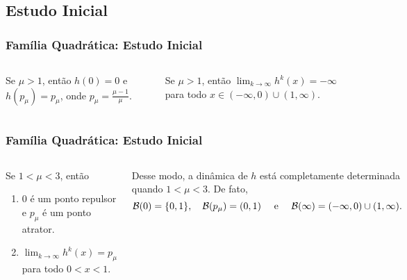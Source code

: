 \subsection{Estudo Inicial}

\begin{frame}
\vspace{5pt}
\frametitle{Família Quadrática: Estudo Inicial}
\begin{columns}
\column{\dimexpr\paperwidth-15pt}

\begin{proposition}
Se $\mu > 1$, então $h(0) = 0$ e $h(p_\mu) = p_\mu$, onde $p_\mu = \frac{\mu-1}{\mu}$.
\end{proposition}

\begin{proposition}
Se $\mu > 1$, então $\lim_{k \to \infty} h^k(x) = - \infty$ para todo $x \in (-\infty, 0) \cup (1, \infty)$.
\end{proposition}

\end{columns}
\end{frame}


\begin{frame}
\vspace{5pt}
\frametitle{Família Quadrática: Estudo Inicial}
\begin{columns}
\column{\dimexpr\paperwidth-15pt}

\begin{proposition}
Se $1 < \mu < 3$, então
\begin{enumerate}
\item $0$ é um ponto repulsor e $p_\mu$ é um ponto atrator.
\item $\lim_{k \to \infty} h^k(x) = p_\mu$ para todo $0 < x < 1$.
\end{enumerate}
\end{proposition}

Desse modo, a dinâmica de $h$ está completamente determinada quando $1 < \mu < 3$. De fato,
$$\mathcal{B}(0) = \lbrace 0, 1 \rbrace, \quad \mathcal{B}(p_\mu) = (0, 1) \quad \text{ e } \quad \mathcal{B}(\infty) = (-\infty, 0) \cup (1, \infty).$$

\end{columns}
\end{frame}
